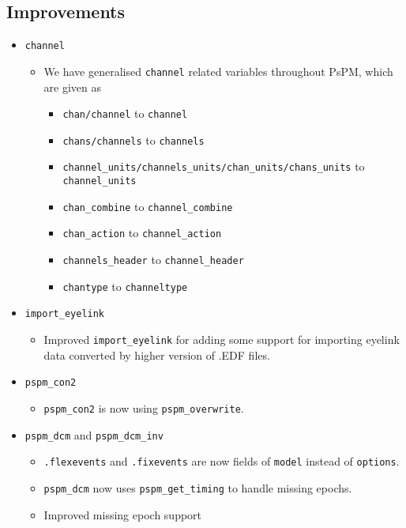 \documentclass[english]{article}
\numberwithin{equation}{section}
\numberwithin{figure}{section}
\begin{document}
\subsection*{Improvements}
    \begin{itemize}
    	\item \texttt{channel}
    	\begin{itemize}
    		\item We have generalised \texttt{channel} related variables throughout PsPM, which are given as 
    		\begin{itemize}
    			\item \texttt{chan/channel} to \texttt{channel}
    			\item \texttt{chans/channels} to \texttt{channels}
    			\item \texttt{channel\_units/channels\_units/chan\_units/chans\_units} to \texttt{channel\_units}
    			\item \texttt{chan\_combine} to \texttt{channel\_combine}
    			\item \texttt{chan\_action} to \texttt{channel\_action}
    			\item \texttt{channels\_header} to \texttt{channel\_header}
    			\item \texttt{chantype} to \texttt{channeltype}
    		\end{itemize}
			\end{itemize}
    	\item \texttt{import\_eyelink}
    	\begin{itemize}
    		\item Improved \texttt{import\_eyelink} for adding some support for importing eyelink data converted by higher version of .EDF files.
    	\end{itemize}
    	\item \texttt{pspm\_con2}
    	\begin{itemize}
    		\item \texttt{pspm\_con2} is now using \texttt{pspm\_overwrite}.
    	\end{itemize}
    	\item \texttt{pspm\_dcm} and \texttt{pspm\_dcm\_inv}
    	\begin{itemize}
    		\item \texttt{.flexevents} and \texttt{.fixevents} are now fields of \texttt{model} instead of \texttt{options}.
    		\item \texttt{pspm\_dcm} now uses \texttt{pspm\_get\_timing} to handle missing epochs.
    		\item Improved missing epoch support

\end{itemize}
\end{itemize}
\end{document}
